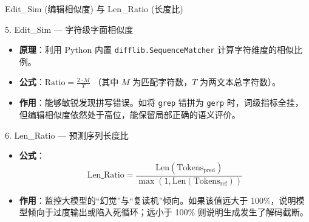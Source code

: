 \documentclass[aspectratio=169]{beamer}
\begin{document}
\begin{frame}{Edit\_Sim (编辑相似度) 与 Len\_Ratio (长度比)}
    \begin{block}{5. Edit\_Sim — 字符级字面相似度}
        \begin{itemize}
            \item \textbf{原理}：利用 Python 内置 \texttt{difflib.SequenceMatcher} 计算字符维度的相似比例。
            \item \textbf{公式}：$\text{Ratio} = \frac{2 \cdot M}{T}$ （其中 $M$ 为匹配字符数，$T$ 为两文本总字符数）。
            \item \textbf{作用}：能够敏锐发现拼写错误。如将 \texttt{grep} 错拼为 \texttt{gerp} 时，词级指标全挂，但编辑相似度依然处于高位，能保留局部正确的语义评价。
        \end{itemize}
    \end{block}

    \begin{block}{6. Len\_Ratio — 预测序列长度比}
        \begin{itemize}
            \item \textbf{公式}：$$\text{Len\_Ratio} = \frac{\text{Len}(\text{Tokens}_{\text{pred}})}{\max(1, \text{Len}(\text{Tokens}_{\text{ref}}))}$$
            \item \textbf{作用}：监控大模型的“幻觉”与“复读机”倾向。如果该值远大于 100\%，说明模型倾向于过度输出或陷入死循环；远小于 100\% 则说明生成发生了解码截断。
        \end{itemize}
    \end{block}
\end{frame}
\end{document}
